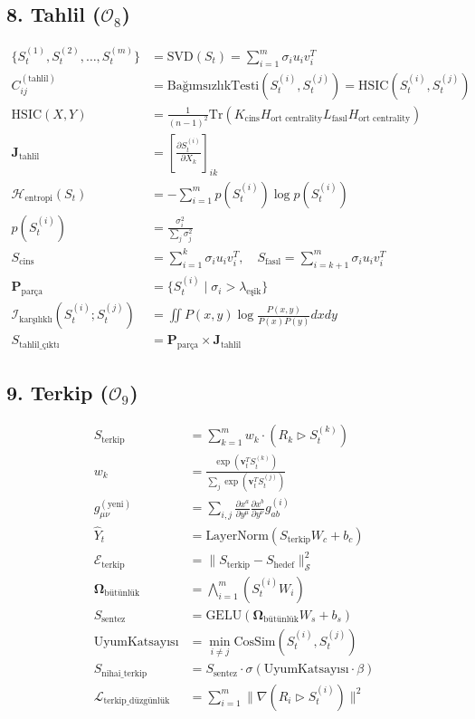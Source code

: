\documentclass[11pt, a4paper]{article}
\begin{document}
\subsection{8. Tahlil ($\mathcal{O}_8$)}
\begin{align}
\{S_t^{(1)}, S_t^{(2)}, \dots, S_t^{(m)}\} &= \text{SVD}(S_t) = \sum_{i=1}^m \sigma_i u_i v_i^T \\
C_{ij}^{(\text{tahlil})} &= \text{BağımsızlıkTesti}(S_t^{(i)}, S_t^{(j)}) = \text{HSIC}(S_t^{(i)}, S_t^{(j)}) \\
\text{HSIC}(X, Y) &= \frac{1}{(n-1)^2} \text{Tr}(K_{\text{cins}} H_{\text{ort centrality}} L_{\text{fasıl}} H_{\text{ort centrality}}) \\
\mathbf{J}_{\text{tahlil}} &= \left[ \frac{\partial S_t^{(i)}}{\partial X_k} \right]_{ik} \\
\mathcal{H}_{\text{entropi}}(S_t) &= -\sum_{i=1}^m p(S_t^{(i)}) \log p(S_t^{(i)}) \\
p(S_t^{(i)}) &= \frac{\sigma_i^2}{\sum_j \sigma_j^2} \\
S_{\text{cins}} &= \sum_{i=1}^k \sigma_i u_i v_i^T, \quad S_{\text{fasıl}} = \sum_{i=k+1}^m \sigma_i u_i v_i^T \\
\mathbf{P}_{\text{parça}} &= \{ S_t^{(i)} \mid \sigma_i > \lambda_{\text{eşik}} \} \\
\mathcal{I}_{\text{karşılıklı}}(S_t^{(i)} ; S_t^{(j)}) &= \iint P(x, y) \log \frac{P(x, y)}{P(x)P(y)} dx dy \\
S_{\text{tahlil\_çıktı}} &= \mathbf{P}_{\text{parça}} \times \mathbf{J}_{\text{tahlil}}
\end{align}

\subsection{9. Terkip ($\mathcal{O}_9$)}
\begin{align}
S_{\text{terkip}} &= \sum_{k=1}^m w_k \cdot \left( R_k \triangleright S_t^{(k)} \right) \\
w_k &= \frac{\exp(\mathbf{v}_t^T S_t^{(k)})}{\sum_j \exp(\mathbf{v}_t^T S_t^{(j)})} \\
g_{\mu\nu}^{(\text{yeni})} &= \sum_{i,j} \frac{\partial x^a}{\partial y^\mu} \frac{\partial x^b}{\partial y^\nu} g_{ab}^{(i)} \\
\hat{Y}_t &= \text{LayerNorm}(S_{\text{terkip}} W_c + b_c) \\
\mathcal{E}_{\text{terkip}} &= \| S_{\text{terkip}} - S_{\text{hedef}} \|_{\mathcal{S}}^2 \\
\mathbf{\Omega}_{\text{bütünlük}} &= \bigwedge_{i=1}^m (S_t^{(i)} W_i) \\
S_{\text{sentez}} &= \text{GELU}\left( \mathbf{\Omega}_{\text{bütünlük}} W_s + b_s \right) \\
\text{UyumKatsayısı} &= \min_{i \neq j} \text{CosSim}(S_t^{(i)}, S_t^{(j)}) \\
S_{\text{nihai\_terkip}} &= S_{\text{sentez}} \cdot \sigma(\text{UyumKatsayısı} \cdot \beta) \\
\mathcal{L}_{\text{terkip\_düzgünlük}} &= \sum_{i=1}^m \| \nabla (R_i \triangleright S_t^{(i)}) \|^2
\end{align}
\end{document}
